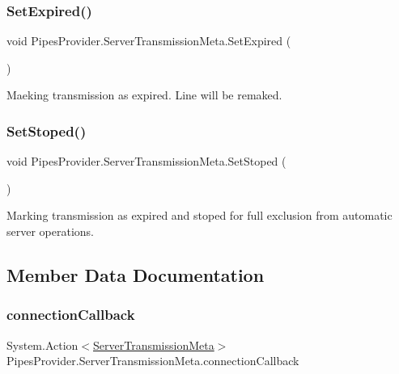 \subsubsection{\texorpdfstring{Set\+Expired()}{SetExpired()}}
{\footnotesize\ttfamily void Pipes\+Provider.\+Server\+Transmission\+Meta.\+Set\+Expired (\begin{DoxyParamCaption}{ }\end{DoxyParamCaption})}



Maeking transmission as expired. Line will be remaked. 

\mbox{\label{class_pipes_provider_1_1_server_transmission_meta_acf5d5cd3ea8799d979a0208d8ae50ff1}} 
\subsubsection{\texorpdfstring{Set\+Stoped()}{SetStoped()}}
{\footnotesize\ttfamily void Pipes\+Provider.\+Server\+Transmission\+Meta.\+Set\+Stoped (\begin{DoxyParamCaption}{ }\end{DoxyParamCaption})}



Marking transmission as expired and stoped for full exclusion from automatic server operations. 



\subsection{Member Data Documentation}
\mbox{\label{class_pipes_provider_1_1_server_transmission_meta_a6e9fa5426107e5d4265273e5be439a62}} 
\subsubsection{\texorpdfstring{connection\+Callback}{connectionCallback}}
{\footnotesize\ttfamily System.\+Action$<$\mbox{\hyperlink{class_pipes_provider_1_1_server_transmission_meta}{Server\+Transmission\+Meta}}$>$ Pipes\+Provider.\+Server\+Transmission\+Meta.\+connection\+Callback}



